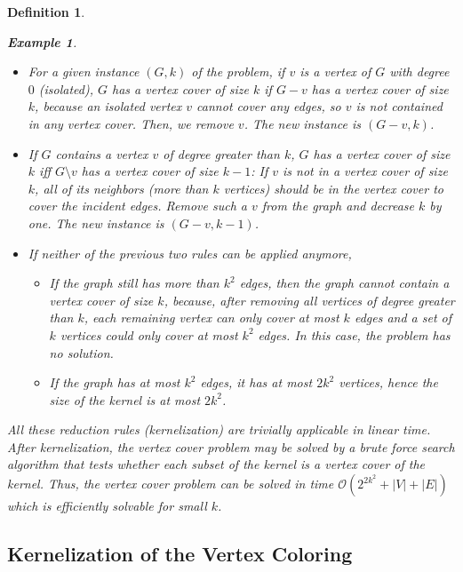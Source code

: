 \documentclass[12pt]{article}
\theoremstyle{slplain}
\newtheorem{defi}{Definition}
\newtheorem{exam}{Example}
\begin{document}
\begin{defi}
\begin{exam}
\begin{itemize}
\item For a given instance $(G,k)$ of the problem, if $v$ is a vertex of $G$ with degree $0$ (isolated), $G$ has a vertex cover of size $k$ if $G-v$ has a vertex cover of size $k$, because an isolated vertex $v$ cannot cover any edges, so $v$ is not contained in any vertex cover. Then, we remove $v$. The new instance is $(G - v , k)$.


\item If $G$ contains a vertex $v$ of degree greater than $k$, $G$ has a vertex cover of size $k$ iff $G\setminus v$ has a vertex cover of size $k - 1$: If $v$ is not in a vertex cover of size $k$, all of its neighbors (more than $k$ vertices) should be in the vertex cover to cover the incident edges. Remove such a $v$ from the graph and decrease $k$ by one. The new instance is $(G - v , k - 1)$.

\item If neither of the previous two rules can be applied anymore,
\begin{itemize}
\item If the graph still has more than $k^2$ edges, then the graph cannot contain a vertex cover of size $k$, because, after  removing all vertices of degree greater than 
$k$, each remaining vertex can only cover at most $k$ edges and a set of
$k$ vertices could only cover at most $k^2$ edges. In this case, the problem has no solution.

\item If the graph has at most $k^2$ edges, it has at most $2 k^2$ vertices, hence the size of the kernel is at most $2 k^2$.
\end{itemize}

  
\end{itemize}



All these reduction rules (kernelization) are trivially applicable in linear time. After kernelization, the vertex cover problem may be solved by a brute force search algorithm that tests whether each subset of the kernel is a vertex cover of the kernel. Thus, the vertex cover problem can be solved in time $\mathcal{O}(2^{2k^2} + |V| + |E|)$ which is efficiently solvable for small $k$.
\end{exam}

\newpage
\subsection{Kernelization of the Vertex Coloring}


\end{defi}
\end{document}
